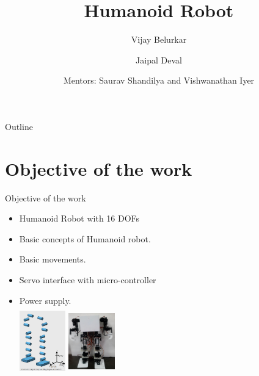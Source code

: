 \documentclass{beamer}
\title[Humanoid Robot] %
{Humanoid Robot}
\author[Vijay \and Jaipal] %
{Vijay Belurkar \and Jaipal Deval}
\institute[IITB] %
{
	E-Yantra Summer Internship Program - 2014,\\
	IIT Bombay\\
	
}
\date[July 8 2014] %
{Mentors: Saurav Shandilya and Vishwanathan Iyer}
\begin{document}
\begin{frame}

  \titlepage
\end{frame}

\begin{frame}{Outline}
  \tableofcontents
\end{frame}

\section{Objective of the work}
\begin{frame}{Objective of the work}
\begin{itemize}
	\item Humanoid Robot with 16 DOFs
	\item Basic concepts of Humanoid robot.
	\item Basic movements.
	\item Servo interface with micro-controller
	\item Power supply.\\
	
	\includegraphics[width=2cm,height=3cm]{Schematic}
	\hspace{1cm}
	\includegraphics[width=2cm,height=3cm]{body_assembly}
\end{itemize}
\end{frame}
\end{document}

